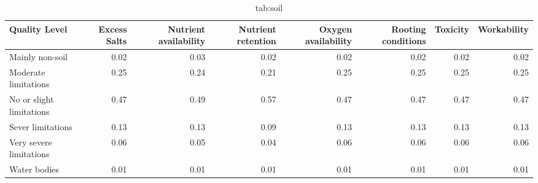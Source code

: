 \begin{table}

\caption{tab:soil}
\centering
\begin{tabular}[t]{lrrrrrrr}
\toprule
Quality Level & Excess Salts & Nutrient availability & Nutrient retention & Oxygen availability & Rooting conditions & Toxicity & Workability\\
\midrule
Mainly non-soil & 0.02 & 0.03 & 0.02 & 0.02 & 0.02 & 0.02 & 0.02\\
Moderate limitations & 0.25 & 0.24 & 0.21 & 0.25 & 0.25 & 0.25 & 0.25\\
No or slight limitations & 0.47 & 0.49 & 0.57 & 0.47 & 0.47 & 0.47 & 0.47\\
Sever limitations & 0.13 & 0.13 & 0.09 & 0.13 & 0.13 & 0.13 & 0.13\\
Very severe limitations & 0.06 & 0.05 & 0.04 & 0.06 & 0.06 & 0.06 & 0.06\\
\addlinespace
Water bodies & 0.01 & 0.01 & 0.01 & 0.01 & 0.01 & 0.01 & 0.01\\
\bottomrule
\end{tabular}
\end{table}
